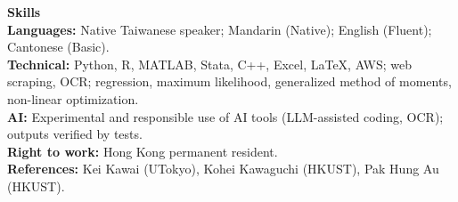\documentclass[11pt,letterpaper]{article}
\begin{document}
\vspace{1pt}

{\large \textbf{Skills}}\\[1pt]
\textbf{Languages:} Native Taiwanese speaker; Mandarin (Native); English (Fluent); Cantonese (Basic).\\
\textbf{Technical:} Python, R, MATLAB, Stata, C++, Excel, \LaTeX, AWS; web scraping, OCR; regression, maximum likelihood, generalized method of moments, non-linear optimization.\\
\textbf{AI:} Experimental and responsible use of AI tools (LLM-assisted coding, OCR); outputs verified by tests.\\
\textbf{Right to work:} Hong Kong permanent resident.\\
\textbf{References:} Kei Kawai (UTokyo), Kohei Kawaguchi (HKUST), Pak Hung Au (HKUST).
\end{document}
